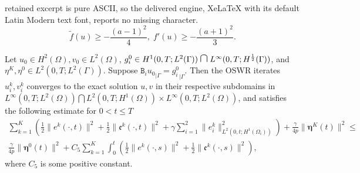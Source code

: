 \documentclass[10pt,a4paper]{amsart}
\newcommand*{\medcap}{\mathbin{\scalebox{1.5}{\ensuremath{\cap}}}}
\begin{document}
retained excerpt is pure ASCII, so the delivered engine, XeLaTeX with its default Latin Modern text font, reports no missing character.
\begin{equation}\label{inequality1}
\widetilde{f}(u)\geq -\frac{(a-1)^2}{4},\;
f'(u)\geq -\frac{(a+1)^2}{3}.
\end{equation}

\begin{theorem}\label{OSWR_thm_conv}
Let $u_0\in H^2(\Omega), v_0\in L^2(\Omega)$, $g_i^{0}\in H^1(0, T;L^2(\Gamma))\medcap L^{\infty}(0, T;H^{\frac{1}{2}}(\Gamma))$, and $\eta^K,  \eta^0 \in L^2(0, T; L^2(\Gamma))$. Suppose ${\mathtt{B}_iu_0}_{|\Gamma}={g_i^{0}}_{|\Gamma}$. Then the OSWR iterates $u_i^{k}, v_i^{k}$ converges to the exact solution $u, v$ in their respective subdomains in $L^{\infty}(0,T;L^2(\Omega))\bigcap L^2(0,T;H^1(\Omega))\times L^{\infty}(0,T;L^2(\Omega))$, and satisfies the following estimate for $0<t\leq T$
\begin{multline}\label{OSWR_est}
 \sum_{k=1}^K  \left( \frac{1}{2}\parallel {e}^{k}(\cdot,t)\parallel^2 + \frac{1}{2}\parallel \mathfrak{e}^{k}(\cdot, t)\parallel^2 +\gamma\sum_{i=1}^2 \parallel {e}_i^{k}\parallel_{L^2(0,t;H^1(\Omega_i))}^2\right) +\frac{\gamma}{4p} \parallel\boldsymbol{\eta}^{K}(t)\parallel^2 \leq \\ \frac{\gamma}{4p} \parallel\boldsymbol{\eta}^{0}(t)\parallel^2 + C_5\sum_{k=1}^K \int_0^t  \left( \frac{1}{2}\parallel {e}^{k}(\cdot,s)\parallel^2 + \frac{1}{2}\parallel \mathfrak{e}^{k}(\cdot, s)\parallel^2 \right), 
\end{multline}
where $C_5$ is some positive constant.
\end{theorem}
\end{document}
